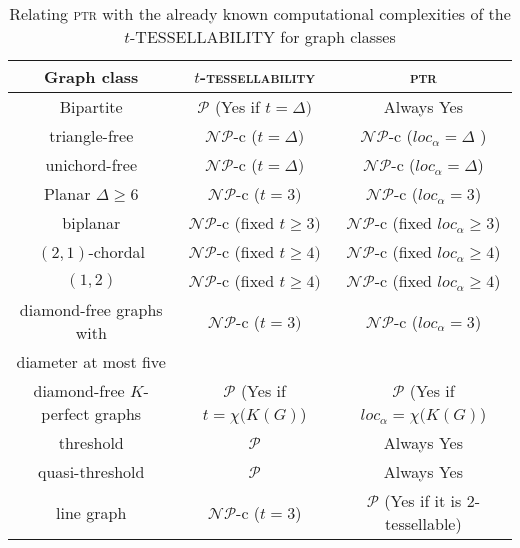 \documentclass[9pt]{entcs} \usepackage{entcsmacro}
\begin{document}
\begin{table}[!h]
\centering
\caption{Relating \textsc{ptr} with the already known computational complexities of the $t$-TESSELLABILITY for graph classes}\label{tab:ComplexResults}

\begin{tabular}{ c|c|c }
Graph class & \textsc{$t$-tessellability} & \textsc{ptr}\\ \hline

Bipartite & $\mathcal{P}$ (Yes if $t=\Delta) $ & Always Yes\\ \hline

triangle-free & $\mathcal{NP}$-c ($t=\Delta) $ & $\mathcal{NP}$-c ($loc_\alpha=\Delta$ )\\ \hline

unichord-free & $\mathcal{NP}$-c ($t=\Delta) $ & $\mathcal{NP}$-c ($loc_\alpha =\Delta$)\\ \hline

Planar $\Delta \geq 6$  & $\mathcal{NP}$-c ($t=3) $ & $\mathcal{NP}$-c ($loc_\alpha=3$)\\ \hline

biplanar & $\mathcal{NP}$-c (fixed $t\geq 3) $ & $\mathcal{NP}$-c (fixed $loc_\alpha \geq 3$)\\ \hline

$(2,1)$-chordal & $\mathcal{NP}$-c (fixed $t\geq 4) $ & $\mathcal{NP}$-c (fixed $loc_\alpha \geq 4$)\\ \hline

$(1,2)$ & $\mathcal{NP}$-c (fixed $t\geq 4) $ & $\mathcal{NP}$-c (fixed $loc_\alpha \geq 4$)\\ \hline

diamond-free graphs with  & $\mathcal{NP}$-c ($t=3) $ & $\mathcal{NP}$-c ($loc_\alpha=3$)\\ 
diameter at most five &  &  \\ \hline

diamond-free $K$-perfect graphs  & $\mathcal{P}$ (Yes if $t=\chi(K(G)$) & $\mathcal{P}$ (Yes if $loc_\alpha=\chi(K(G)$)\\\hline 

threshold & $\mathcal{P}$  & Always Yes\\ \hline

quasi-threshold & $\mathcal{P}$  & Always Yes\\ \hline

line graph & $\mathcal{NP}$-c ($t=3$)  & $\mathcal{P}$ (Yes if it is $2$-tessellable)\\ \hline

\end{tabular}
\end{table}
\end{document}
